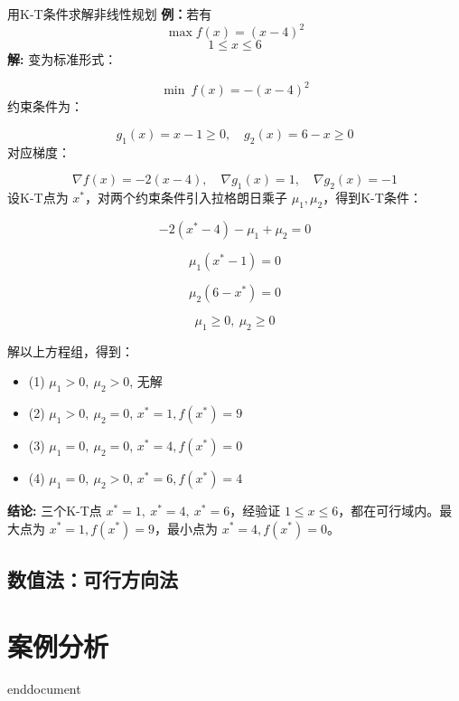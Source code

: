 \begin{exbox}{用K-T条件求解非线性规划}{}
\textbf{例：}若有
$$
\max f(x)=(x-4)^2
$$
$$
1\leq x \leq 6
$$
\textbf{解:} 变为标准形式：

\[
\min \ f(x) = -(x-4)^2
\]
约束条件为：

\[
g_1(x) = x - 1 \geq 0, \quad g_2(x) = 6 - x \geq 0
\]
对应梯度：

\[
\nabla f(x) = -2(x - 4), \quad \nabla g_1(x) = 1, \quad \nabla g_2(x) = -1
\]
设K-T点为 \( x^* \)，对两个约束条件引入拉格朗日乘子 \( \mu_1, \mu_2 \)，得到K-T条件：

\[
-2(x^* - 4) - \mu_1 + \mu_2 = 0
\]

\[
\mu_1 (x^* - 1) = 0
\]

\[
\mu_2 (6 - x^*) = 0
\]

\[
\mu_1 \geq 0, \ \mu_2 \geq 0
\]

解以上方程组，得到：
\begin{itemize}
    \item (1) \( \mu_1 > 0, \ \mu_2 > 0 \), 无解
    \item (2) \( \mu_1 > 0, \ \mu_2 = 0 \), \( x^* = 1, f(x^*) = 9 \)
    \item (3) \( \mu_1 = 0, \ \mu_2 = 0 \), \( x^* = 4, f(x^*) = 0 \)
    \item (4) \( \mu_1 = 0, \ \mu_2 > 0 \), \( x^* = 6, f(x^*) = 4 \)
\end{itemize}

\textbf{结论:} 三个K-T点 \( x^* = 1, \ x^* = 4, \ x^* = 6 \)，经验证 \( 1 \leq x \leq 6 \)，都在可行域内。最大点为 \( x^* = 1, f(x^*) = 9 \)，最小点为 \( x^* = 4, f(x^*) = 0 \)。
\end{exbox}


\subsection{数值法：可行方向法}
\section{案例分析}


\ifx\allfiles\undefined
	
	
	
	end{document}
	\else
	\fi